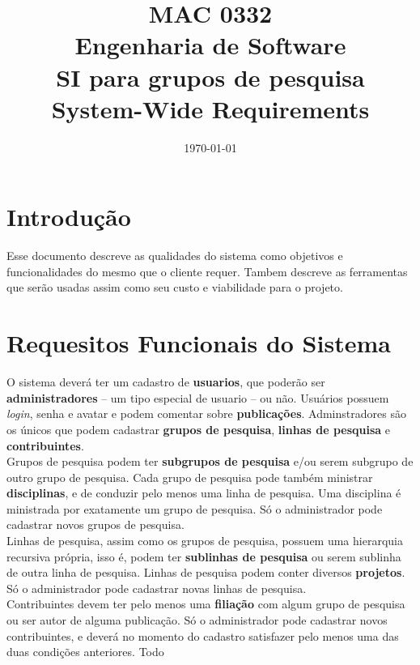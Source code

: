 \documentclass[11pt, a4paper]{article}
\title{MAC 0332\\
	Engenharia de Software\\
	SI para grupos de pesquisa\\
	System-Wide Requirements}
\date{\today}
\begin{document}
	\maketitle
	\newpage
	
	\section{Introdução}
		Esse documento descreve as qualidades do sistema como objetivos e 
		funcionalidades do mesmo que o cliente requer. Tambem descreve as 
		ferramentas que serão usadas assim como seu custo e viabilidade para 
		o projeto. 
	\section{Requesitos Funcionais do Sistema}
		O sistema deverá ter um cadastro de \textbf{usuarios}, que poderão ser
		\textbf{administradores} -- um tipo especial de usuario -- ou não. Usuários possuem
		\textit{login}, senha e avatar e podem comentar sobre \textbf{publicações}. Adminstradores
		são os únicos que podem cadastrar \textbf{grupos de pesquisa}, \textbf{linhas de pesquisa} e
		\textbf{contribuintes}.\\
		\indent Grupos de pesquisa podem ter \textbf{subgrupos de pesquisa} e/ou serem subgrupo de
		outro grupo de pesquisa. Cada grupo de pesquisa pode também ministrar \textbf{disciplinas}, 
		e de conduzir pelo menos uma linha de pesquisa. Uma disciplina é ministrada por exatamente
		um grupo de pesquisa. Só o administrador pode cadastrar novos grupos de pesquisa.\\
		\indent Linhas de pesquisa, assim como os grupos de pesquisa, possuem uma hierarquia
		recursiva própria, isso é, podem ter \textbf{sublinhas de pesquisa} ou serem sublinha de
		outra linha de pesquisa. Linhas de pesquisa podem conter diversos \textbf{projetos}. Só o
		administrador pode cadastrar novas linhas de pesquisa.\\
		\indent Contribuintes devem ter pelo menos uma \textbf{filiação} com algum grupo de pesquisa
		ou ser autor de alguma publicação. Só o administrador pode cadastrar novos contribuintes, e
		deverá no momento do cadastro satisfazer pelo menos uma das duas condições anteriores. Todo
\end{document}
